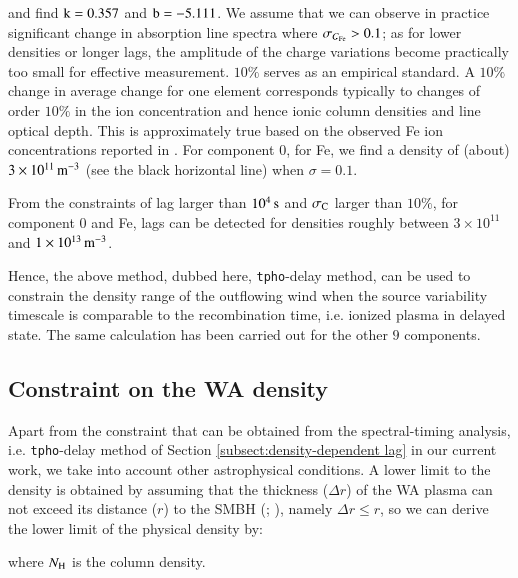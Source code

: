 \documentclass{aa}
\begin{document}
and find $\rm k=0.357$ and $\rm b=-5.111$. 
We assume that we can observe in practice significant change in absorption line spectra where $\sigma_{C_{\rm Fe}} > 0.1$; as for lower densities or longer lags, the amplitude of the charge variations become practically too small for effective measurement.
$10\%$ serves as an empirical standard. A $10\%$ change in average change for one element corresponds typically to changes of order $10\%$ in the ion concentration and hence ionic column densities and line optical depth. This is approximately true based on the observed Fe ion concentrations reported in \cite{Kaspi2002ApJ}.
For component $0$, for Fe, we find a density of (about) $\rm 3 \times 10^{11} \,  m^{-3}$ (see the black horizontal line) when $\sigma = 0.1$.





From the constraints of lag larger than $10^4 \, \rm s$ and $\sigma_{\rm C}$ larger than $10 \%$, for component $0$ and Fe, lags can be detected for densities roughly between $3 \times 10^{11}$ and $\rm 1 \times 10^{13} \, m^{-3}$.


Hence, the above method, dubbed here, \texttt{tpho}-delay method, can be used to constrain the density range of the outflowing wind when the source variability timescale is comparable to the recombination time, i.e. ionized plasma in delayed state.
The same calculation has been carried out for the other $9$ components.







 



\subsection{Constraint on the WA density}\label{subsect:constraint on WA density}

Apart from the constraint that can be obtained from the spectral-timing analysis, i.e. \texttt{tpho}-delay method of Section \ref{subsect:density-dependent lag} in our current work, we take into account other astrophysical conditions.
A lower limit to the density is obtained by assuming that the thickness ($\Delta r$) of the WA plasma can not exceed its distance ($r$) to the SMBH (\citealp{Krolik2001ApJ}; \citealp{Blustin2005A&A}), namely \( \Delta r \leq r \),
so we can derive the lower limit of the physical density by:

where $N_{\rm H}$ is the column density.
\end{document}
